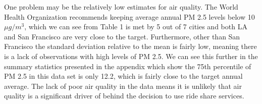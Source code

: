 \documentclass[12pt,letter paper]{article}
\begin{document}
One problem may be the relatively low estimates for air quality.  The World Health Organization recommends keeping average annual PM 2.5 levels below 10 $\mu g / m^3$, which we can see from Table 1 is met by 5 out of 7 cities and both LA and San Francisco are very close to the target.  Furthermore, other than San Francisco the standard deviation relative to the mean is fairly low, meaning there is a lack of observations with high levels of PM 2.5.  We can see this further in the summary statistics presented in the appendix which show the 75th percentile of PM 2.5 in this data set is only 12.2, which is fairly close to the target annual average.  The lack of poor air quality in the data means it is unlikely that air quality is a significant driver of behind the decision to use ride share services.  \\
\end{document}
